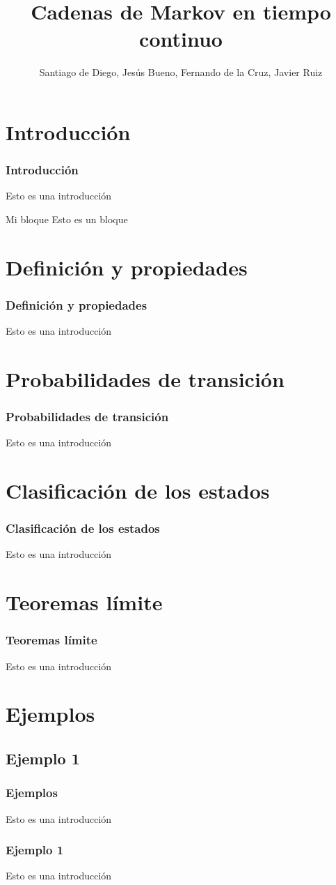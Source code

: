 \documentclass{beamer}
\title[CMTC]{Cadenas de Markov en tiempo continuo}
\author[Santiago,Jesus,Fernando]{Santiago de Diego, Jesús Bueno, Fernando de la Cruz, Javier Ruiz}
\date{}
\begin{document}
\frame{\titlepage}



\section{Introducción}
\begin{frame}
    \frametitle{Introducción}
    Esto es una introducción
       \begin{block}{Mi bloque}
  		Esto es un bloque
  		\end{block}
\end{frame}

\section{Definición y propiedades}
\begin{frame}
    \frametitle{Definición y propiedades}
    Esto es una introducción
\end{frame}

\section{Probabilidades de transición}
\begin{frame}
    \frametitle{Probabilidades de transición}
    Esto es una introducción
\end{frame}

\section{Clasificación de los estados}
\begin{frame}
    \frametitle{Clasificación de los estados}
    Esto es una introducción
\end{frame}

\section{Teoremas límite}
\begin{frame}
    \frametitle{Teoremas límite}
    Esto es una introducción
\end{frame}

\section{Ejemplos}
\subsection{Ejemplo 1}
\begin{frame}
    \frametitle{Ejemplos}
    Esto es una introducción
\end{frame}
\begin{frame}
    \frametitle{Ejemplo 1}
    Esto es una introducción
\end{frame}
\end{document}
